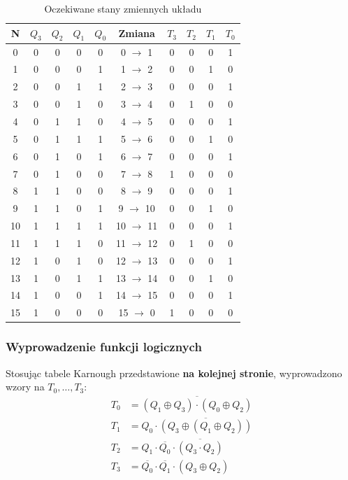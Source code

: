 \documentclass[12pt,a4paper,table]{article}
\begin{document}
    \begin{table}[h]
        \centering
        \begin{tabular}{|c|cccc|c|cccc|} 
            \hline
            N & $Q_3$ & $Q_2$ & $Q_1$ & $Q_0$ & Zmiana & $T_3$ & $T_2$ & $T_1$ & $T_0$ \\ \hline
            0&	0&	0&	0&	0&	0 $\rightarrow$ 1&	    0&	0&	0&	1 \\
            1&	0&	0&	0&	1&	1 $\rightarrow$ 2&	    0&	0&	1&	0 \\
            2&	0&	0&	1&	1&	2 $\rightarrow$ 3&	    0&	0&	0&	1 \\
            3&	0&	0&	1&	0&	3 $\rightarrow$ 4&	    0&	1&	0&	0 \\
            4&	0&	1&	1&	0&	4 $\rightarrow$ 5&	    0&	0&	0&	1 \\
            5&	0&	1&	1&	1&	5 $\rightarrow$ 6&	    0&	0&	1&	0 \\
            6&	0&	1&	0&	1&	6 $\rightarrow$ 7&	    0&	0&	0&	1 \\
            7&	0&	1&	0&	0&	7 $\rightarrow$ 8&	    1&	0&	0&	0 \\
            8&	1&	1&	0&	0&	8 $\rightarrow$ 9&	    0&	0&	0&	1 \\
            9&	1&	1&	0&	1&	9 $\rightarrow$ 10&    0&	0&	1&	0 \\
            10&	1&	1&	1&	1&	10 $\rightarrow$ 11&	0&	0&	0&	1 \\
            11&	1&	1&	1&	0&	11 $\rightarrow$ 12&	0&	1&	0&	0 \\
            12&	1&	0&	1&	0&	12 $\rightarrow$ 13&	0&	0&	0&	1 \\
            13&	1&	0&	1&	1&	13 $\rightarrow$ 14&	0&	0&	1&	0 \\
            14&	1&	0&  0&	1&	14 $\rightarrow$ 15&	0&	0&	0&	1 \\
            15&	1&	0&	0&	0&	15 $\rightarrow$ 0&    1&	0&	0&	0 \\
            \hline
        \end{tabular}
        \caption{Oczekiwane stany zmiennych układu}
        \label{tab:gray_states}
    \end{table}
    
    \subsubsection{Wyprowadzenie funkcji logicznych}
    Stosując tabele Karnough przedstawione \textbf{na kolejnej stronie}, wyprowadzono wzory na $T_0, \dots, T_3$:
    \begin{align*}
        T_0 &= \overline{(Q_1 \oplus Q_3) \cdot (Q_0 \oplus Q_2)} \\
        T_1 &= Q_0 \cdot \overline{(Q_3 \oplus (Q_1 \oplus Q_2))} \\
        T_2 &= Q_1 \cdot \overline{Q_0} \cdot \overline{(Q_3 \cdot Q_2)} \\
        T_3 &= \overline{Q_0} \cdot \overline{Q_1} \cdot (Q_3 \oplus Q_2)
    \end{align*}
    
\end{document}
